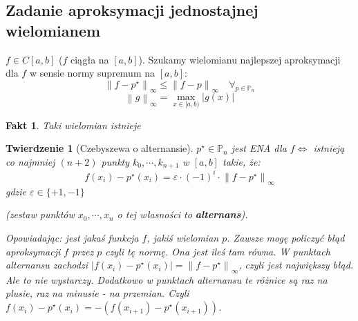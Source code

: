 \documentclass[hidelinks,a4paper,fleqn,oneside]{book}
\newcommand{\norm}[1]{\left\lVert#1\right\rVert}
\newtheorem{fakt}{Fakt}
\newtheorem{twierdz}{Twierdzenie}
\begin{document}
\subsection{Zadanie aproksymacji jednostajnej wielomianem}
$f \in C[a, b]$ ($f$ ciągła na $[a,b]$). Szukamy wielomianu najlepszej aproksymacji dla $f$ w sensie normy supremum na $[a,b]$:
\[
	\norm{f - p^\star}_\infty \leq \norm{f - p}_\infty \quad \forall_{p \in \mathbb{P}_n}
\]
\[
	\norm{g}_\infty = \max_{x \in [a, b)}|g(x)|
\]

\begin{fakt}
	Taki wielomian istnieje
\end{fakt}

\begin{twierdz}[Czebyszewa o alternansie]
 $p^\star \in \mathbb{P}_n$ jest ENA dla $f \iff$ istnieją co najmniej $(n+2)$ punkty $k_0, \cdots, k_{n+1}$ w $[a,b]$ takie, że:
 \[
 	f(x_i) - p^\star(x_i) = \varepsilon \cdot (-1)^i \cdot \norm{f - p^\star}_\infty
 \]
 gdzie $\varepsilon \in \{+1, -1\}$
 
(zestaw punktów $x_0, \cdots, x_n$ o tej własności to \textbf{alternans}).
 
Opowiadając: jest jakaś funkcja $f$, jakiś wielomian $p$. Zawsze mogę policzyć błąd aproksymacji $f$ przez $p$ czyli tę normę. Ona jest ileś tam równa. W punktach alternansu zachodzi $|f(x_i) - p^\star(x_i)| = \norm{f-p^\star}_\infty$, czyli jest największy błąd. Ale to nie wystarczy. Dodatkowo w punktach alternansu te różnice są raz na plusie, raz na minusie - na przemian. Czyli $f(x_i) - p^\star(x_i) = -(f(x_{i+1})-p^\star(x_{i+1}))$.
\end{twierdz}
\end{document}
